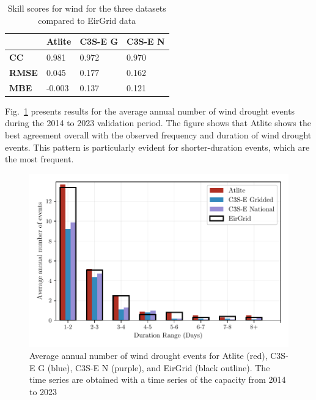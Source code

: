 \documentclass[a4paper, 11p1t]{article}
\begin{document}
\begin{table}[!ht]
	\centering
	\begin{tabular}{l|lll|}
		\cline{2-4}
		& \textbf{Atlite} & \textbf{C3S-E G} & \textbf{C3S-E N} \\ \hline
		\multicolumn{1}{|l|}{\textbf{CC}}   & 0.981           & 0.972            & 0.970            \\ \hline
		\multicolumn{1}{|l|}{\textbf{RMSE}} & 0.045           & 0.177            & 0.162            \\ \hline
		\multicolumn{1}{|l|}{\textbf{MBE}}   & -0.003          & 0.137            & 0.121            \\ \hline
	\end{tabular}
	\caption{Skill scores for wind for the three datasets compared to EirGrid data}
	\label{tab:wind_skill_scores}
\end{table}

Fig.~\ref{fig:bar_number_events_verification_wind} presents results for the average annual number of wind drought events during the 2014 to 2023 validation period. The figure shows that Atlite shows the best agreement overall with the observed frequency and duration of wind drought events. This pattern is particularly evident for shorter-duration events, which are the most frequent.

\begin{figure}[!ht]
	\centering
	\includegraphics{verification_wind_number_events.pdf}
	\caption{Average annual number of wind drought events for Atlite (red), C3S-E G (blue), C3S-E N (purple), and EirGrid (black outline). The time series are obtained with a time series of the capacity from 2014 to 2023}
	\label{fig:bar_number_events_verification_wind}
\end{figure}
\end{document}
